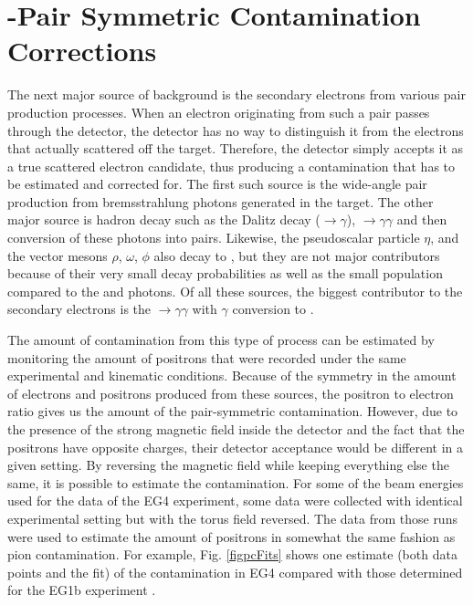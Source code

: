 
\section{\epem-Pair Symmetric Contamination Corrections}
The next major source of background is the secondary electrons from various \epems pair production processes. When an electron originating from such a pair passes through the detector, the detector has no way to distinguish it from the electrons that actually scattered off the target. Therefore, the detector simply accepts it as a true scattered electron candidate, thus producing a %
contamination that has to be estimated and corrected for. %
The first such source is the wide-angle \epems pair production from bremsstrahlung photons generated in the target. The other major source is hadron decay such as the Dalitz decay (\piz$\rightarrow$\epem$\gamma$), \piz$\rightarrow\gamma\gamma$ and then conversion of these photons into \epems pairs. Likewise, the pseudoscalar particle $\eta$, and the vector mesons $\rho$, $\omega$, $\phi$ also decay to \epem, but they are not major contributors because of their very small decay probabilities as well as the small population compared to the \pizs and photons. Of all these sources, the biggest contributor to the secondary electrons is the %
\piz$\rightarrow\gamma\gamma$ with $\gamma$ conversion to \epems \cite{bostedBckgCont}.

The amount of contamination from this type of process can be estimated by monitoring the amount of positrons that were recorded under the same experimental and kinematic conditions. Because of the symmetry in the amount of electrons and positrons produced from these sources, the positron to electron ratio %
gives us the amount of the pair-symmetric contamination. However, due to the presence of the strong magnetic field inside the detector and the fact that the positrons have opposite charges, their detector acceptance would be different in a given setting. %
By reversing the magnetic field while keeping everything else the same, it is possible to estimate the contamination. For some of the beam energies used for the  data %
of the EG4 experiment, some data were collected with identical experimental setting but with the torus field reversed. The data from those runs were used to estimate the amount of positrons in somewhat the same fashion as pion contamination. %
For example, Fig. \ref{figpcFits} shows one estimate (both data points and the fit) of the contamination in EG4 compared with those determined for the EG1b experiment \cite{nGuler_th}.



